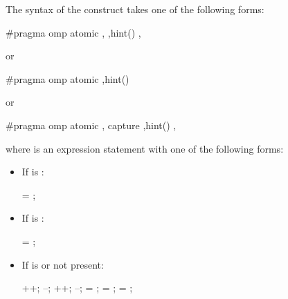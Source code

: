 \begin{ccppspecific}
The syntax of the  construct takes one of the following forms:

\begin{ompcPragma}
#pragma omp atomic \plc{[memory-order-clause[},\plc{]]} 
                   \plc{[[},\plc{]}hint()\plc{]}
                   \plc{[[},\plc{]memory-order-clause]} 
\end{ompcPragma}


or

\begin{ompcPragma}
#pragma omp atomic  \plc{[[},\plc{]}hint()\plc{]} 
\end{ompcPragma}

or

\begin{ompcPragma}
#pragma omp atomic \plc{[memory-order-clause[},\plc{]]} capture
                   \plc{[[},\plc{]}hint()\plc{]}
                   \plc{[[},\plc{]memory-order-clause]} 
\end{ompcPragma}

where  is an expression statement with one of the following forms:

\begin{itemize}
\item If  is :
\begin{ompSyntax}
 = ;
\end{ompSyntax}


\item If  is :
\begin{ompSyntax}
 = ;
\end{ompSyntax}

\item If  is  or not present:
\begin{ompSyntax}
++;
--;
++;
--;
 = ;
 =   ;
 =   ;
\end{ompSyntax}


\end{itemize}
\end{ccppspecific}
